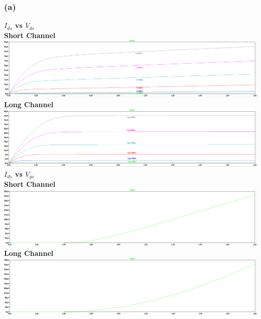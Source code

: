 \documentclass{article}
\begin{document}
\subsubsection*{(a)}
\textbf{$I_{ds}$ vs $V_{ds}$}\\
 \newline
\textbf{Short Channel}\\
\includegraphics[scale=0.28]{./figs/Q4_a_nmos_sc_vds.png}\\
 \newline
\textbf{Long Channel}\\
\includegraphics[scale=0.28]{./figs/Q4_a_nmos_lc_vds.png}
 \newline
 \newline
\textbf{$I_{ds}$ vs $V_{gs}$}\\
 \newline
\textbf{Short Channel}\\
\includegraphics[scale=0.28]{./figs/Q4_a_nmos_sc_vgs.png}\\
 \newline
\textbf{Long Channel}\\
\includegraphics[scale=0.28]{./figs/Q4_a_nmos_lc_vgs.png}
\end{document}
